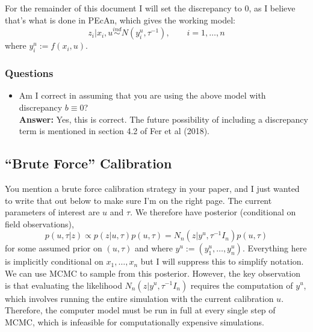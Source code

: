\documentclass[12pt]{article}
\begin{document}
For the remainder of this document I will set the discrepancy to $0$, as I believe that's what is done in PEcAn, which gives the working model: 
\[z_i|x_i, u \overset{ind}{\sim} N(y_i^u, \tau^{-1}), \qquad i = 1, \dots, n \]
where $y_i^u := f(x_i, u)$. 

\subsubsection{Questions}
\begin{itemize}
\item Am I correct in assuming that you are using the above model with discrepancy $b \equiv 0$? \\
\textbf{Answer: } Yes, this is correct. The future possibility of including a discrepancy term is mentioned in section 4.2 of Fer et al (2018). 
\end{itemize}

\subsection{``Brute Force'' Calibration}
You mention a brute force calibration strategy in your paper, and I just wanted to write that out below to make sure I'm on the right page. The current parameters of interest are
$u$ and $\tau$. We therefore have posterior (conditional on field observations), 
\[p(u, \tau|z) \propto p(z|u, \tau)p(u, \tau) = N_n(z|y^u, \tau^{-1} I_n)p(u, \tau)\]
for some assumed prior on $(u, \tau)$ and where $y^u := (y_1^u, \dots, y_n^u)$. Everything here is implicitly conditional on $x_1, \dots, x_n$ but I will suppress this to simplify notation. 
We can use MCMC to sample from this posterior. However, the key observation is that evaluating the likelihood $N_n(z|y^u, \tau^{-1} I_n)$ requires the computation of $y^u$, which 
involves running the entire simulation with the current calibration $u$. Therefore, the computer model must be run in full at every single step of MCMC, 
which is infeasible for computationally expensive simulations. 
\end{document}
